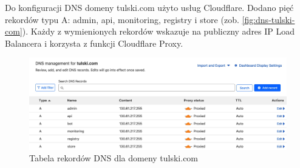 Do konfiguracji DNS domeny tulski.com użyto usług Cloudflare.
Dodano pięć rekordów typu A: admin, api, monitoring, registry i store (zob. \autoref{fig:dns-tulski-com}).
Każdy z wymienionych rekordów wskazuje na publiczny adres IP Load Balancera i korzysta z funkcji Cloudflare Proxy.

\begin{figure}[H]
    \centering
    \includegraphics[width=\textwidth]{img/dns-tulski-com}
    \caption{Tabela rekordów DNS dla domeny tulski.com}
    \label{fig:dns-tulski-com}
\end{figure}

%
%

%

